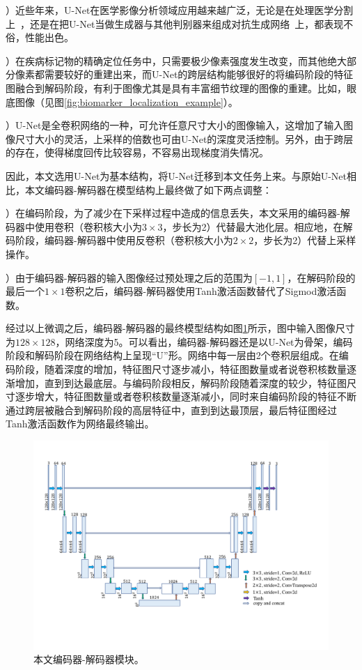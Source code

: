 ）近些年来，U-Net在医学影像分析领域应用越来越广泛，无论是在处理医学分割上~\cite{oktay2018attention, dong2017automatic, zhang2018ct}，还是在把U-Net当做生成器与其他判别器来组成对抗生成网络~\cite{Han2018SpineGANSS}上，都表现不俗，性能出色。

）在疾病标记物的精确定位任务中，只需要极少像素强度发生改变，而其他绝大部分像素都需要较好的重建出来，而U-Net的跨层结构能够很好的将编码阶段的特征图融合到解码阶段，有利于图像尤其是具有丰富细节纹理的图像的重建。比如，眼底图像（见图\ref{fig:biomarker_localization_example}）。

）U-Net是全卷积网络的一种，可允许任意尺寸大小的图像输入，这增加了输入图像尺寸大小的灵活，上采样的倍数也可由U-Net的深度灵活控制。另外，由于跨层的存在，使得梯度回传比较容易，不容易出现梯度消失情况。

\noindent 因此，本文选用U-Net为基本结构，将U-Net迁移到本文任务上来。与原始U-Net相比，本文编码器-解码器在模型结构上最终做了如下两点调整：

）在编码阶段，为了减少在下采样过程中造成的信息丢失，本文采用的编码器-解码器中使用卷积（卷积核大小为$3\times 3$，步长为2）代替最大池化层。相应地，在解码阶段，编码器-解码器中使用反卷积（卷积核大小为$2\times 2$，步长为2）代替上采样操作。

）由于编码器-解码器的输入图像经过预处理之后的范围为$[-1,1]$，在解码阶段的最后一个$1\times 1$卷积之后，编码器-解码器使用Tanh激活函数替代了Sigmod激活函数。

\noindent 经过以上微调之后，编码器-解码器的最终模型结构如图\ref{fig:auto_encoder_architecture}所示，图中输入图像尺寸为$128\times 128$，网络深度为5。可以看出，编码器-解码器还是以U-Net为骨架，编码阶段和解码阶段在网络结构上呈现“U”形。网络中每一层由2个卷积层组成。在编码阶段，随着深度的增加，特征图尺寸逐步减小，特征图数量或者说卷积核数量逐渐增加，直到到达最底层。与编码阶段相反，解码阶段随着深度的较少，特征图尺寸逐步增大，特征图数量或者卷积核数量逐渐减小，同时来自编码阶段的特征不断通过跨层被融合到解码阶段的高层特征中，直到到达最顶层，最后特征图经过Tanh激活函数作为网络最终输出。
\begin{figure}[h]
	\centering
	\includegraphics[width=1.0\textwidth]{figure/auto_encoder_architecture}
	\caption[本文编码器-解码器模块]{本文编码器-解码器模块。}
	\label{fig:auto_encoder_architecture}
\end{figure}
